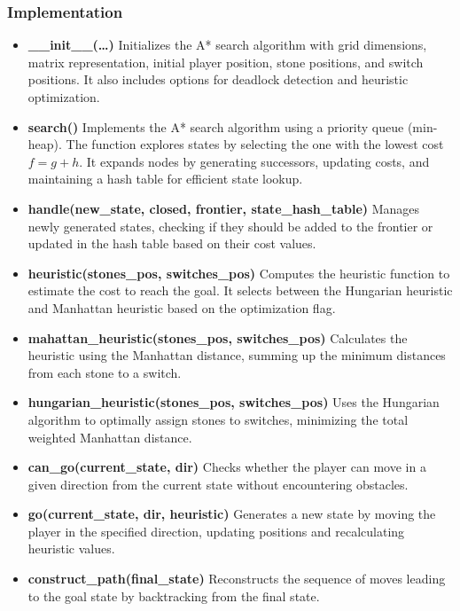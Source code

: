 \subsubsection{Implementation}
\begin{itemize}
	\item \textbf{\_\_init\_\_(\ldots)}
	      Initializes the A* search algorithm with grid dimensions, matrix representation, initial player position, stone positions, and switch positions. It also includes options for deadlock detection and heuristic optimization.

	\item \textbf{search()}
	      Implements the A* search algorithm using a priority queue (min-heap). The function explores states by selecting the one with the lowest cost \(f = g + h\). It expands nodes by generating successors, updating costs, and maintaining a hash table for efficient state lookup.

	\item \textbf{handle(new\_state, closed, frontier, state\_hash\_table)}
	      Manages newly generated states, checking if they should be added to the frontier or updated in the hash table based on their cost values.

	\item \textbf{heuristic(stones\_pos, switches\_pos)}
	      Computes the heuristic function to estimate the cost to reach the goal. It selects between the Hungarian heuristic and Manhattan heuristic based on the optimization flag.

	\item \textbf{mahattan\_heuristic(stones\_pos, switches\_pos)}
	      Calculates the heuristic using the Manhattan distance, summing up the minimum distances from each stone to a switch.

	\item \textbf{hungarian\_heuristic(stones\_pos, switches\_pos)}
	      Uses the Hungarian algorithm to optimally assign stones to switches, minimizing the total weighted Manhattan distance.

	\item \textbf{can\_go(current\_state, dir)}
	      Checks whether the player can move in a given direction from the current state without encountering obstacles.

	\item \textbf{go(current\_state, dir, heuristic)}
	      Generates a new state by moving the player in the specified direction, updating positions and recalculating heuristic values.

	\item \textbf{construct\_path(final\_state)}
	      Reconstructs the sequence of moves leading to the goal state by backtracking from the final state.

\end{itemize}

